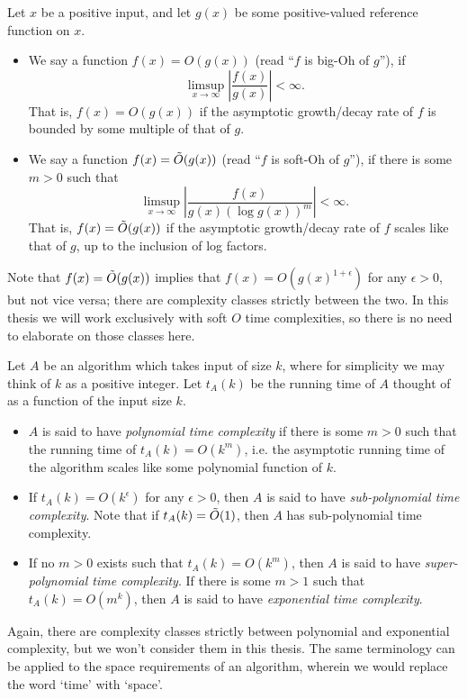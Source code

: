 \begin{definition}
Let $x$ be a positive input, and let $g(x)$ be some positive-valued reference function on $x$.
\begin{itemize}
\item We say a function $f(x) = O(g(x))$ (read ``$f$ is big-Oh of $g$''), if
\begin{equation}
\limsup_{x \to \infty} \left| \frac{f(x)}{g(x)}\right| < \infty.
\end{equation}
That is, $f(x) = O(g(x))$ if the asymptotic growth/decay rate of $f$ is bounded by some multiple of that of $g$.
\item We say a function $f(x) = \tilde{O}(g(x))$ (read ``$f$ is soft-Oh of $g$''), if there is some $m>0$ such that
\begin{equation}
\limsup_{x \to \infty} \left| \frac{f(x)}{g(x)\left(\log g(x)\right)^m}\right| < \infty.
\end{equation}
That is, $f(x) = \tilde{O}(g(x))$ if the asymptotic growth/decay rate of $f$ scales like that of $g$, up to the inclusion of log factors.
\end{itemize}
\end{definition}
Note that $f(x) = \tilde{O}(g(x))$ implies that $f(x) = O(g(x)^{1+\epsilon})$ for any $\epsilon>0$, but not vice versa; there are complexity classes strictly between the two. In this thesis we will work exclusively with soft $O$ time complexities, so there is no need to elaborate on those classes here.\\

\begin{definition}
Let $A$ be an algorithm which takes input of size $k$, where for simplicity we may think of $k$ as a positive integer. Let $t_A(k)$ be the running time of $A$ thought of as a function of the input size $k$.
\begin{itemize}
\item $A$ is said to have {\it polynomial time complexity} if there is some $m>0$ such that the running time of $t_A(k) = O(k^{m})$, i.e. the asymptotic running time of the algorithm scales like some polynomial function of $k$.
\item If $t_A(k) = O(k^{\epsilon})$ for any $\epsilon>0$, then $A$ is said to have {\it sub-polynomial time complexity}. Note that if $t_A(k) = \tilde{O}(1)$, then $A$ has sub-polynomial time complexity.
\item If no $m>0$ exists such that $t_A(k) = O(k^m)$, then $A$ is said to have {\it super-polynomial time complexity}. If there is some $m>1$ such that $t_A(k) = O(m^k)$, then $A$ is said to have {\it exponential time complexity}.
\end{itemize}
\end{definition}
Again, there are complexity classes strictly between polynomial and exponential complexity, but we won't consider them in this thesis. The same terminology can be applied to the space requirements of an algorithm, wherein we would replace the word `time' with `space'. \\

